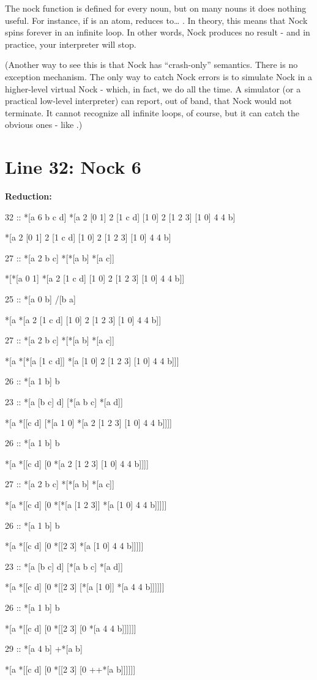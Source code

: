 The nock function is defined for every noun, but on many nouns it does nothing
useful.  For instance, if  is an atom,  reduces to\ldots{} .  In theory,
this means that Nock spins forever in an infinite loop.  In other words, Nock
produces no result - and in practice, your interpreter will stop.

(Another way to see this is that Nock has ``crash-only'' semantics.  There is no
exception mechanism.  The only way to catch Nock errors is to simulate Nock in
a higher-level virtual Nock - which, in fact, we do all the time.  A simulator
(or a practical low-level interpreter) can report, out of band, that Nock would
not terminate.  It cannot recognize all infinite loops, of course, but it can
catch the obvious ones - like .)

\section{Line 32: Nock 6}

\textbf{ Reduction:}

\begin{code}
32 ::    *[a 6 b c d]      *[a 2 [0 1] 2 [1 c d] [1 0] 2 [1 2 3] [1 0] 4 4 b]

*[a 2 [0 1] 2 [1 c d] [1 0] 2 [1 2 3] [1 0] 4 4 b]

27 ::    *[a 2 b c]        *[*[a b] *[a c]]

*[*[a 0 1] *[a 2 [1 c d] [1 0] 2 [1 2 3] [1 0] 4 4 b]]

25 ::    *[a 0 b]          /[b a]

*[a *[a 2 [1 c d] [1 0] 2 [1 2 3] [1 0] 4 4 b]]

27 ::    *[a 2 b c]        *[*[a b] *[a c]]

*[a *[*[a [1 c d]] *[a [1 0] 2 [1 2 3] [1 0] 4 4 b]]]

26 ::    *[a 1 b]          b

23 ::    *[a [b c] d]      [*[a b c] *[a d]]

*[a *[[c d] [*[a 1 0] *[a 2 [1 2 3] [1 0] 4 4 b]]]]

26 ::    *[a 1 b]          b

*[a *[[c d] [0 *[a 2 [1 2 3] [1 0] 4 4 b]]]]

27 ::    *[a 2 b c]        *[*[a b] *[a c]]

*[a *[[c d] [0 *[*[a [1 2 3]] *[a [1 0] 4 4 b]]]]]

26 ::    *[a 1 b]          b

*[a *[[c d] [0 *[[2 3] *[a [1 0] 4 4 b]]]]]

23 ::    *[a [b c] d]      [*[a b c] *[a d]]

*[a *[[c d] [0 *[[2 3] [*[a [1 0]] *[a 4 4 b]]]]]]

26 ::    *[a 1 b]          b

*[a *[[c d] [0 *[[2 3] [0 *[a 4 4 b]]]]]]

29 ::    *[a 4 b]          +*[a b]

*[a *[[c d] [0 *[[2 3] [0 ++*[a b]]]]]]
\end{code}


